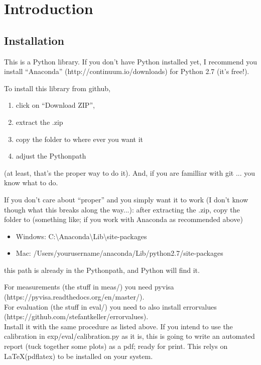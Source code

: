 \section{Introduction}

\subsection{Installation}

This is a Python library.
If you don't have Python installed yet,
I recommend you install ``Anaconda'' (http://continuum.io/downloads)
for Python 2.7 (it's free!).

To install this library
from github,
\begin{enumerate}
  \item click on ``Download ZIP'',
  \item extract the .zip
  \item copy the folder to where ever you want it
  \item adjust the Pythonpath
\end{enumerate}
(at least, that's the proper way to do it).  
And, if you are familliar with git ... you know what to do.

If you don't care about ``proper''
and you simply want it to work
(I don't know though what this breaks along the way...):  
after extracting the .zip,
copy the folder to (something like; if you work with Anaconda as recommended above)
\begin{itemize}
  \item Windows: C:\textbackslash Anaconda\textbackslash Lib\textbackslash site-packages
  \item Mac: /Users/yourusername/anaconda/Lib/python2.7/site-packages
\end{itemize}
this path is already in the Pythonpath,
and Python will find it.

For measurements (the stuff in meas/) you need pyvisa \\
(https://pyvisa.readthedocs.org/en/master/).\\
For evaluation (the stuff in eval/) you need to also install errorvalues \\
(https://github.com/stefantkeller/errorvalues). \\
Install it with the same procedure as listed above.
If you intend to use the calibration in exp/eval/calibration.py as it is,
this is going to write an automated report (tuck together some plots) as a pdf;
ready for print.
This relys on \LaTeX (pdflatex) to be installed on your system.

